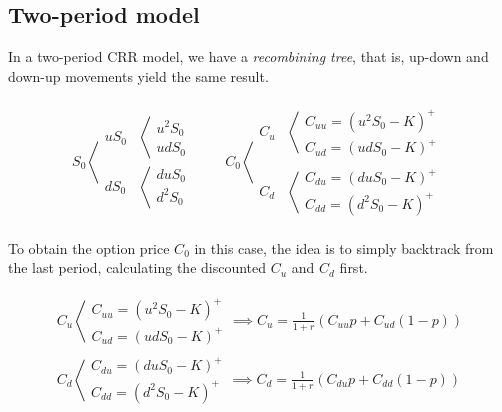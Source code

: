 \documentclass[oneside,titlepage,headinclude,12pt,a4paper,BCOR5mm,footinclude]{book}
\theoremstyle{defn}
\begin{document}
\subsection{Two-period model}

In a two-period CRR model, we have a \textit{recombining tree}, that is, up-down
and down-up movements yield the same result.

\begin{gather*}
  S_0 \left\langle 
    \begin{array}{ll}
      uS_0 & \left\langle 
        \begin{array}{l}
          u^2S_0 \\
          udS_0
        \end{array} 
      \\
      dS_0 & \left\langle
        \begin{array}{l}
          duS_0 \\
          d^2 S_0
        \end{array} 
    \end{array} 
  \quad\quad
  C_0 \left\langle 
    \begin{array}{ll}
      C_u & \left\langle 
        \begin{array}{l}
          C_{uu} = (u^2S_0-K)^+ \\
          C_{ud} = (udS_0-K)^+
        \end{array} 
      \\
      C_d & \left\langle
        \begin{array}{l}
          C_{du} = (duS_0-K)^+ \\
          C_{dd} = (d^2S_0-K)^+
        \end{array} 
    \end{array} 
\end{gather*}

To obtain the option  price $C_0$ in this case, the idea  is to simply backtrack
from the last period, calculating the discounted $C_u$ and $C_d$ first.

\begin{gather*}
  C_u \left\langle 
    \begin{array}{l}
      C_{uu} = (u^2S_0-K)^+ \\
      C_{ud} = (udS_0-K)^+
    \end{array} 
  \implies
  C_u = \frac{1}{1+r}(C_{uu} p + C_{ud}(1-p))
  \\
  C_d \left\langle
    \begin{array}{l}
      C_{du} = (duS_0-K)^+ \\
      C_{dd} = (d^2S_0-K)^+
    \end{array} 
  \implies
  C_d = \frac{1}{1+r}(C_{du} p + C_{dd}(1-p))
\end{gather*}
\end{document}
